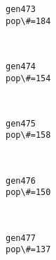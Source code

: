 \documentclass[11pt]{article}
\begin{document}
    \begin{Verbatim}[commandchars=\\\{\}]
gen473
pop\#=184

    \end{Verbatim}

    \begin{center}
    \end{center}
    { \hspace*{\fill} \\}
    
    \begin{Verbatim}[commandchars=\\\{\}]
gen474
pop\#=154

    \end{Verbatim}

    \begin{center}
    \end{center}
    { \hspace*{\fill} \\}
    
    \begin{Verbatim}[commandchars=\\\{\}]
gen475
pop\#=158

    \end{Verbatim}

    \begin{center}
    \end{center}
    { \hspace*{\fill} \\}
    
    \begin{Verbatim}[commandchars=\\\{\}]
gen476
pop\#=150

    \end{Verbatim}

    \begin{center}
    \end{center}
    { \hspace*{\fill} \\}
    
    \begin{Verbatim}[commandchars=\\\{\}]
gen477
pop\#=137

    \end{Verbatim}
\end{document}

